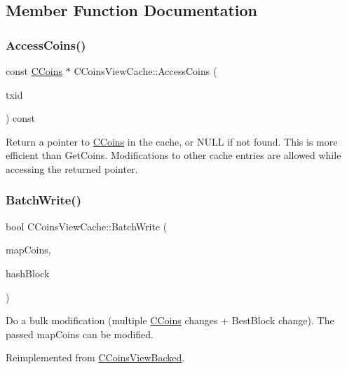\subsection{Member Function Documentation}
\mbox{\label{class_c_coins_view_cache_a8e5341e8b01233949d6170dd4d1fd75d}} 
\subsubsection{\texorpdfstring{AccessCoins()}{AccessCoins()}}
{\footnotesize\ttfamily const \mbox{\hyperlink{class_c_coins}{C\+Coins}} $\ast$ C\+Coins\+View\+Cache\+::\+Access\+Coins (\begin{DoxyParamCaption}\item[{const \mbox{\hyperlink{classuint256}{uint256}} \&}]{txid }\end{DoxyParamCaption}) const}

Return a pointer to \mbox{\hyperlink{class_c_coins}{C\+Coins}} in the cache, or N\+U\+LL if not found. This is more efficient than Get\+Coins. Modifications to other cache entries are allowed while accessing the returned pointer. \mbox{\label{class_c_coins_view_cache_a561bb7c6c97701b12c48fbbb563d0a91}} 
\subsubsection{\texorpdfstring{BatchWrite()}{BatchWrite()}}
{\footnotesize\ttfamily bool C\+Coins\+View\+Cache\+::\+Batch\+Write (\begin{DoxyParamCaption}\item[{C\+Coins\+Map \&}]{map\+Coins,  }\item[{const \mbox{\hyperlink{classuint256}{uint256}} \&}]{hash\+Block }\end{DoxyParamCaption})\hspace{0.3cm}{\ttfamily [virtual]}}

Do a bulk modification (multiple \mbox{\hyperlink{class_c_coins}{C\+Coins}} changes + Best\+Block change). The passed map\+Coins can be modified. 

Reimplemented from \mbox{\hyperlink{class_c_coins_view_backed_ace15da3934c9d7a9cb9c7a787f92f764}{C\+Coins\+View\+Backed}}.

